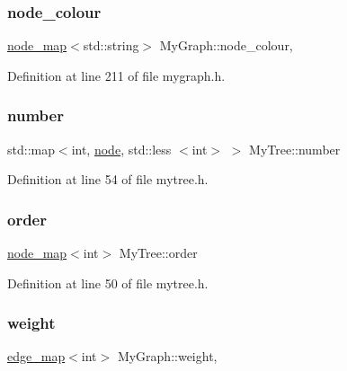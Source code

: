\subsubsection{\texorpdfstring{node\+\_\+colour}{node\_colour}}
{\footnotesize\ttfamily \mbox{\hyperlink{classnode__map}{node\+\_\+map}}$<$std\+::string$>$ My\+Graph\+::node\+\_\+colour\hspace{0.3cm}{\ttfamily [protected]}, {\ttfamily [inherited]}}



Definition at line 211 of file mygraph.\+h.

\mbox{\label{class_my_tree_a307b02f445704719cfbc4229690e20d7}} 
\subsubsection{\texorpdfstring{number}{number}}
{\footnotesize\ttfamily std\+::map$<$int, \mbox{\hyperlink{classnode}{node}}, std\+::less $<$int$>$ $>$ My\+Tree\+::number\hspace{0.3cm}{\ttfamily [protected]}}



Definition at line 54 of file mytree.\+h.

\mbox{\label{class_my_tree_afbd5fcfe2a1033b7b440bb2fcf55bb21}} 
\subsubsection{\texorpdfstring{order}{order}}
{\footnotesize\ttfamily \mbox{\hyperlink{classnode__map}{node\+\_\+map}}$<$int$>$ My\+Tree\+::order\hspace{0.3cm}{\ttfamily [protected]}}



Definition at line 50 of file mytree.\+h.

\mbox{\label{class_my_graph_aa6e12f16153220780e9db1eb30112b34}} 
\subsubsection{\texorpdfstring{weight}{weight}}
{\footnotesize\ttfamily \mbox{\hyperlink{classedge__map}{edge\+\_\+map}}$<$int$>$ My\+Graph\+::weight\hspace{0.3cm}{\ttfamily [protected]}, {\ttfamily [inherited]}}

